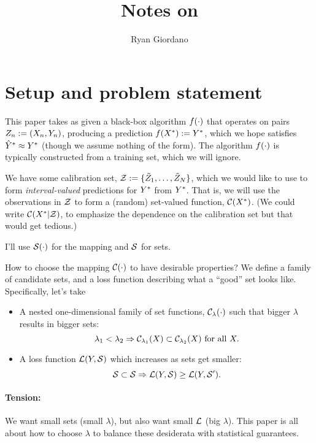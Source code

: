 \documentclass[twoside,11pt]{article}
\numberwithin{equation}{section}
\begin{document}
\title{Notes on \citet{bates:2021:distributionpredictionsets}}

\author{Ryan Giordano}


\maketitle

\section{Setup and problem statement}


This paper takes as given a black-box algorithm $f(\cdot)$ that operates on
pairs $Z_n := (X_n, Y_n)$, producing a prediction $f(X^{*}) := Y^{*}$,
which we hope satisfies $\hat{Y}^{*} \approx Y^{*}$ (though we assume nothing of the
form).  The algorithm $f(\cdot)$ is typically constructed from a training
set, which we will ignore.

We have some calibration set, $\mathcal{Z} := \{ \tilde{Z}_1, \ldots, \tilde{Z}_N\}$,
which we would like to use to form \textit{interval-valued} predictions
for $Y^{*}$ from $Y^{*}$.  That is, we will use the observations in $\mathcal{Z}$
to form a (random) set-valued function, $\mathcal{C}(X^{*})$.  (We could
write $\mathcal{C}(X^{*} | \mathcal{Z})$, to emphasize
the dependence on the calibration set but that would get tedious.)

I'll use $\mathcal{S}(\cdot)$ for the mapping and $\mathcal{S}$ for sets.

How to choose the mapping $\mathcal{C}(\cdot)$ to have desirable properties?
We define a family of candidate sets, and a loss function describing
what a ``good'' set looks like.  Specifically, let's take
%
\begin{itemize}
%
    \item A nested one-dimensional family of set functions,
    $\mathcal{C}_{\lambda}(\cdot)$ such that bigger $\lambda$ results in bigger sets:
    $$\lambda_1 < \lambda_2 \Rightarrow \mathcal{C}_{\lambda_1}(X) \subset
    \mathcal{C}_{\lambda_2}(X) \textrm{ for all }X.$$
    \item A loss function $\mathcal{L}(Y, \mathcal{S})$ which increases as sets get smaller:
    $$\mathcal{S} \subset \mathcal{S} \Rightarrow \mathcal{L}(Y, \mathcal{S}) \ge \mathcal{L}(Y,\mathcal{S}').$$
%
\end{itemize}
%
\paragraph{Tension:} We want small sets (small $\lambda$), but also want small
$\mathcal{L}$ (big $\lambda$).  This paper is all about how to choose $\lambda$ to
balance these desiderata with statistical guarantees.
\end{document}
